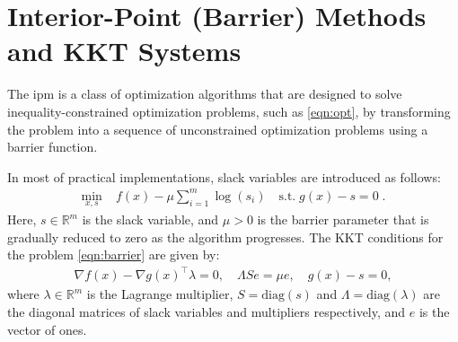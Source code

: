 \documentclass{article}
\begin{document}








\section{Interior-Point (Barrier) Methods and KKT Systems}\label{eqn:ipm}
The \gls*{ipm} is a class of optimization algorithms that are designed to solve inequality-constrained optimization problems, such as \cref{eqn:opt}, by transforming the problem into a sequence of unconstrained optimization problems using a barrier function.

In most of practical implementations, slack variables are introduced as follows:
\begin{align}\label{eqn:barrier}
  \min_{x,s } \; & f(x) - \mu \sum_{i=1}^m \log(s_i) \quad \text{s.t.} \; g(x) - s = 0 \;.
\end{align}
Here, $s \in \mathbb{R}^m$ is the slack variable, and $\mu > 0$ is the barrier parameter that is gradually reduced to zero as the algorithm progresses.
The KKT conditions for the problem \cref{eqn:barrier} are given by:
\begin{align}\label{eqn:kkt}
  \nabla f(x) - \nabla g(x)^\top \lambda = 0, \quad
  \Lambda S e = \mu e,\quad
  g(x) - s =   0 ,
\end{align}
where $\lambda \in \mathbb{R}^m$ is the Lagrange multiplier, $S = \text{diag}(s)$
and $\Lambda = \text{diag}(\lambda)$ are the diagonal matrices of slack variables and
multipliers respectively, and $e$ is the vector of ones.
\end{document}
